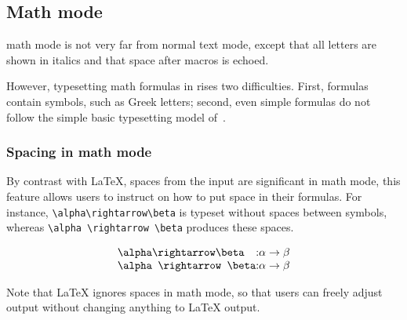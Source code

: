 \subsection{Math mode}
\hevea{} math mode is not very far from normal text mode, except that
all letters are shown in italics and that space after macros
is echoed.

However, typesetting math formulas in \html{} rises two difficulties.
First, formulas contain symbols, such as Greek letters; second,
even simple formulas do not follow the simple basic typesetting model of~\html.


\subsubsection{Spacing\label{spacemath} in math mode}
By contrast with \LaTeX{}, spaces from the input are significant in
math mode, this
feature allows users to instruct \hevea{}
on how to put space in their formulas.
For instance, \verb+\alpha\rightarrow\beta+ is typeset without spaces between
symbols, whereas \verb+\alpha \rightarrow \beta+ produces these spaces.
\begin{htmlonly}
$$
\begin{array}{l@{ : }l}
\verb+\alpha\rightarrow\beta+ & \alpha\rightarrow\beta\\
\verb+\alpha \rightarrow \beta+ & \alpha \rightarrow \beta\\
\end{array}
$$
\end{htmlonly}
Note that \LaTeX{} ignores spaces in math mode, so that users can
freely adjust \hevea{} output without changing anything to \LaTeX{}
output.


